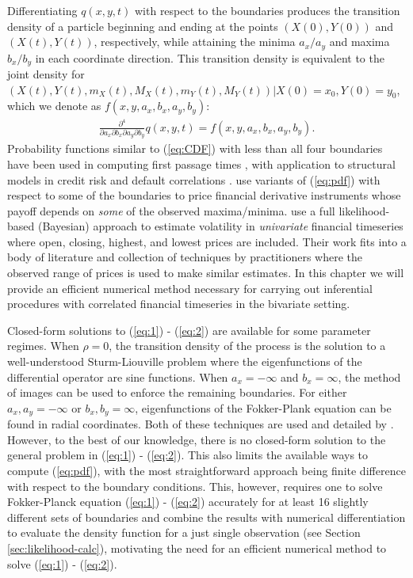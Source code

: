 Differentiating $q(x,y,t)$ with respect to the boundaries produces the
transition density of a particle beginning and ending at the points
$(X(0), Y(0))$ and $(X(t), Y(t))$, respectively, while
attaining the minima $a_x/a_y$ and maxima $b_x/b_y$ in each coordinate
direction. This transition density is equivalent to the joint density
for $(X(t), Y(t), m_X(t), M_X(t), m_Y(t), M_Y(t))| X(0)=x_0, Y(0)=y_0$,
which we denote as $f(x,y,a_x,b_x,a_y,b_y)$:
\begin{align}
  \frac{\partial^4}{\partial a_x \partial b_x \partial a_y \partial b_y} q(x,y,t) = f(x,y,a_x,b_x,a_y,b_y).
  \label{eq:pdf}
\end{align}
Probability functions similar to (\ref{eq:CDF}) with less than all
four boundaries have been used in computing first passage times
\cite{kou2016first, sacerdote2016first}, with application to
structural models in credit risk and default correlations
\cite{haworth2008modelling, ching2014correlated}. \cite{he1998double}
use variants of (\ref{eq:pdf}) with respect to some of the boundaries
to price financial derivative instruments whose payoff depends on
\textit{some} of the observed maxima/minima. \cite{rodriguez2012} use
a full likelihood-based (Bayesian) approach to estimate volatility in
\textit{univariate} financial timeseries where open, closing, highest,
and lowest prices are included. Their work fits into a body of
literature and collection of techniques by practitioners where the
observed range of prices is used to make similar estimates. In this
chapter we will provide an efficient numerical method necessary for
carrying out inferential procedures with correlated financial
timeseries in the bivariate setting.

Closed-form solutions to (\ref{eq:1}) - (\ref{eq:2}) are available for
some parameter regimes. When $\rho = 0$, the transition density of the
process is the solution to a well-understood Sturm-Liouville problem
where the eigenfunctions of the differential operator are sine
functions. When $a_x = -\infty$ and $b_x = \infty$, the method of
images can be used to enforce the remaining boundaries. For either
$a_x, a_y = -\infty$ or $b_x, b_y = \infty$, eigenfunctions of the
Fokker-Plank equation can be found in radial coordinates. Both of
these techniques are used and detailed by
\cite{he1998double}. However, to the best of our knowledge, there is
no closed-form solution to the general problem in (\ref{eq:1}) -
(\ref{eq:2}). This also limits the available ways to compute
(\ref{eq:pdf}), with the most straightforward approach being finite
difference with respect to the boundary conditions. This, however,
requires one to solve Fokker-Planck equation (\ref{eq:1}) - (\ref{eq:2})
accurately for at least 16 slightly different sets of boundaries and
combine the results with numerical differentiation to evaluate the
density function for a just single observation (see Section
\ref{sec:likelihood-calc}), motivating the need for an efficient
numerical method to solve (\ref{eq:1}) - (\ref{eq:2}).

